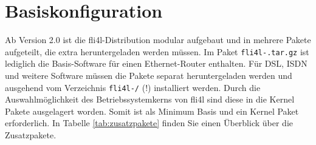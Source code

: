 \chapter{Basiskonfiguration}

Ab Version 2.0 ist die fli4l-Distribution modular aufgebaut und in
mehrere Pakete aufgeteilt, die extra heruntergeladen werden müssen. Im
Paket \texttt{fli4l-\version.tar.gz} ist lediglich die
Basis-Software für einen Ethernet-Router enthalten. Für DSL, ISDN und
weitere Software müssen die Pakete separat heruntergeladen werden und
ausgehend vom Verzeichnis \texttt{fli4l-\version/} (!) installiert
werden. Durch die Auswahlmöglichkeit des Betriebssystemkerns von fli4l
sind diese in die Kernel Pakete ausgelagert worden. Somit ist als Minimum
Basis und ein Kernel Paket erforderlich.
In Tabelle \ref{tab:zusatzpakete} finden Sie einen
Überblick über die Zusatzpakete.

